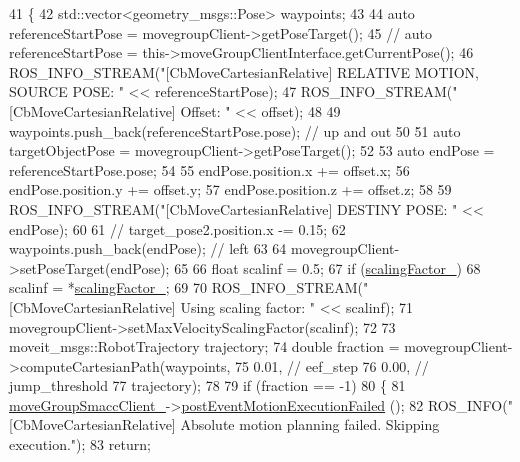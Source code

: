 \begin{DoxyCode}
41 \{
42   std::vector<geometry\_msgs::Pose> waypoints;
43 
44   \textcolor{keyword}{auto} referenceStartPose = movegroupClient->getPoseTarget();
45   \textcolor{comment}{// auto referenceStartPose = this->moveGroupClientInterface.getCurrentPose();}
46   ROS\_INFO\_STREAM(\textcolor{stringliteral}{"[CbMoveCartesianRelative] RELATIVE MOTION, SOURCE POSE: "} << referenceStartPose);
47   ROS\_INFO\_STREAM(\textcolor{stringliteral}{"[CbMoveCartesianRelative] Offset: "} << offset);
48 
49   waypoints.push\_back(referenceStartPose.pose);  \textcolor{comment}{// up and out}
50 
51   \textcolor{keyword}{auto} targetObjectPose = movegroupClient->getPoseTarget();
52 
53   \textcolor{keyword}{auto} endPose = referenceStartPose.pose;
54 
55   endPose.position.x += offset.x;
56   endPose.position.y += offset.y;
57   endPose.position.z += offset.z;
58 
59   ROS\_INFO\_STREAM(\textcolor{stringliteral}{"[CbMoveCartesianRelative] DESTINY POSE: "} << endPose);
60 
61   \textcolor{comment}{// target\_pose2.position.x -= 0.15;}
62   waypoints.push\_back(endPose);  \textcolor{comment}{// left}
63 
64   movegroupClient->setPoseTarget(endPose);
65 
66   \textcolor{keywordtype}{float} scalinf = 0.5;
67   \textcolor{keywordflow}{if} (\hyperlink{classmoveit__z__client_1_1CbMoveCartesianRelative_a0d483fda685fe6ef7e68240ae5b2140d}{scalingFactor\_})
68     scalinf = *\hyperlink{classmoveit__z__client_1_1CbMoveCartesianRelative_a0d483fda685fe6ef7e68240ae5b2140d}{scalingFactor\_};
69 
70   ROS\_INFO\_STREAM(\textcolor{stringliteral}{"[CbMoveCartesianRelative] Using scaling factor: "} << scalinf);
71   movegroupClient->setMaxVelocityScalingFactor(scalinf);
72 
73   moveit\_msgs::RobotTrajectory trajectory;
74   \textcolor{keywordtype}{double} fraction = movegroupClient->computeCartesianPath(waypoints,
75                                                           0.01,  \textcolor{comment}{// eef\_step}
76                                                           0.00,  \textcolor{comment}{// jump\_threshold}
77                                                           trajectory);
78 
79   \textcolor{keywordflow}{if} (fraction == -1)
80   \{
81     \hyperlink{classmoveit__z__client_1_1CbMoveCartesianRelative_abe1a99706adf6cb61aacb034e0b6a4c9}{moveGroupSmaccClient\_}->\hyperlink{classmoveit__z__client_1_1ClMoveGroup_a42bede73264ae2d5dfe0117315042acb}{postEventMotionExecutionFailed}
      ();
82     ROS\_INFO(\textcolor{stringliteral}{"[CbMoveCartesianRelative] Absolute motion planning failed. Skipping execution."});
83     \textcolor{keywordflow}{return};

\end{DoxyCode}
